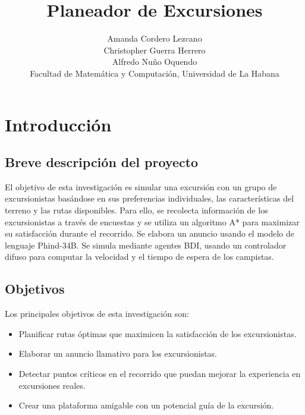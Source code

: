 \documentclass[10pt,twocolumn]{article}
\begin{document}
	\title{Planeador de Excursiones}
	\author{
		Amanda Cordero Lezcano\\
		Christopher Guerra Herrero\\
		Alfredo Nuño Oquendo\\Facultad de Matemática y Computación, Universidad de La Habana
	}
	
	\section{Introducción}
	\subsection{Breve descripción del proyecto}
	El objetivo de esta investigación es simular una excursión con un grupo de excursionistas basándose en sus preferencias individuales, las características del terreno y las rutas disponibles. Para ello, se recolecta información de los excursionistas a través de encuestas y se utiliza un algoritmo A* para maximizar su satisfacción durante el recorrido. Se elabora un anuncio usando el modelo de lenguaje Phind-34B. Se simula mediante agentes BDI, usando un controlador difuso para computar la velocidad y el tiempo de espera de los campistas.
	
	\subsection{Objetivos}
	Los principales objetivos de esta investigación son:
	\begin{itemize}
		\item Planificar rutas óptimas que maximicen la satisfacción de los excursionistas.
		\item Elaborar un anuncio llamativo para los excursionistas.
		\item Detectar puntos críticos en el recorrido que puedan mejorar la experiencia en excursiones reales.
		\item Crear una plataforma amigable con un potencial guía de la excursión.
	\end{itemize}
	
\end{document}
